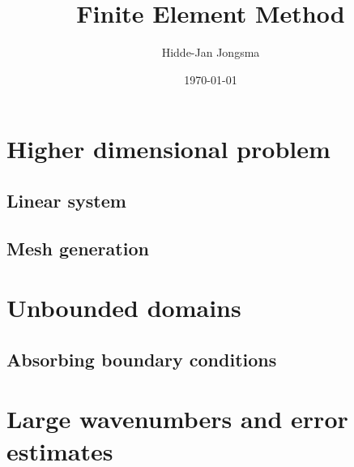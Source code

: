 \documentclass[a4paper]{article}
\author{Hidde-Jan Jongsma}
\title{Finite Element Method}
\date{\today}
\begin{document}
\section{Higher dimensional problem}

\subsection{Linear system}

\subsection{Mesh generation}


\section{Unbounded domains}

\subsection{Absorbing boundary conditions}


\section{Large wavenumbers and error estimates}
\end{document}
